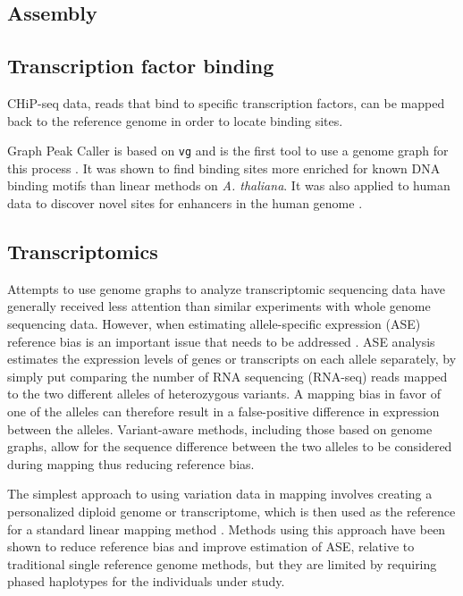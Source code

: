 \subsection{Assembly}

\subsection{Transcription factor binding}

CHiP-seq data, reads that bind to specific transcription factors, can be mapped back to the reference genome in order to locate binding sites.
 
Graph Peak Caller is based on \texttt{vg} and is the first tool to use a genome graph for this process \cite{Grytten_2019}.
It was shown to find binding sites more enriched for known DNA binding motifs than linear methods on \emph{A.
thaliana}.
It was also applied to human data to discover novel sites for enhancers in the human genome \cite{groza2019personalized}. 


\subsection{Transcriptomics}

Attempts to use genome graphs to analyze transcriptomic sequencing data have generally received less attention than similar experiments with whole genome sequencing data.
However, when estimating allele-specific expression (ASE) reference bias is an important issue that needs to be addressed \cite{Degner2009-vw,Castel2015-ef}.
ASE analysis estimates the expression levels of genes or transcripts on each allele separately, by simply put comparing the number of RNA sequencing (RNA-seq) reads mapped to the two different alleles of heterozygous variants.
A mapping bias in favor of one of the alleles can therefore result in a false-positive difference in expression between the alleles.
Variant-aware methods, including those based on genome graphs, allow for the sequence difference between the two alleles to be considered during mapping thus reducing reference bias.

The simplest approach to using variation data in mapping involves creating a personalized diploid genome or transcriptome, which is then used as the reference for a standard linear mapping method \cite{Turro2011-op,Rozowsky_2011,Bray_2016,Raghupathy2018-sd}.
Methods using this approach have been shown to reduce reference bias and improve estimation of ASE, relative to traditional single reference genome methods, but they are limited by requiring phased haplotypes for the individuals under study.

